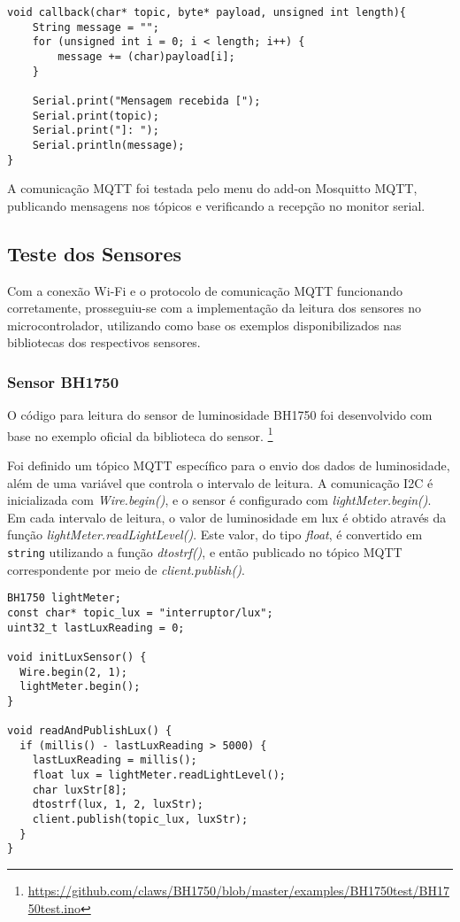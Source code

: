 \documentclass[]{abntex2}
\begin{document}
\begin{verbatim}
void callback(char* topic, byte* payload, unsigned int length){
	String message = "";
	for (unsigned int i = 0; i < length; i++) {
		message += (char)payload[i];
	}

	Serial.print("Mensagem recebida [");
	Serial.print(topic);
	Serial.print("]: ");
	Serial.println(message);
}
\end{verbatim}

A comunicação MQTT foi testada pelo menu do add-on Mosquitto MQTT, publicando
mensagens nos tópicos e verificando a recepção no monitor serial.

\subsection{Teste dos Sensores}
Com a conexão Wi-Fi e o protocolo de comunicação MQTT funcionando corretamente,
prosseguiu-se com a implementação da leitura dos sensores no microcontrolador,
utilizando como base os exemplos disponibilizados nas bibliotecas dos
respectivos sensores.

\subsubsection{Sensor BH1750}

O código para leitura do sensor de luminosidade BH1750 foi desenvolvido com base no exemplo
oficial da biblioteca do sensor.
\footnote{\url{https://github.com/claws/BH1750/blob/master/examples/BH1750test/BH1750test.ino}}


Foi definido um tópico MQTT específico para o envio dos dados de luminosidade,
além de uma variável que controla o intervalo de leitura. A comunicação I2C é
inicializada com
\textit{Wire.begin()}, e o sensor é configurado com
\textit{lightMeter.begin()}.
Em cada intervalo de leitura, o valor de luminosidade em lux é obtido através
da função \textit{lightMeter.readLightLevel()}. Este valor, do tipo
\textit{float}, é convertido em \texttt{string} utilizando a função
\textit{dtostrf()}, e então publicado no tópico MQTT correspondente por meio de
\textit{client.publish()}.
\clearpage
\begin{verbatim}
BH1750 lightMeter;
const char* topic_lux = "interruptor/lux";
uint32_t lastLuxReading = 0;

void initLuxSensor() {
  Wire.begin(2, 1);
  lightMeter.begin();
}

void readAndPublishLux() {
  if (millis() - lastLuxReading > 5000) {
    lastLuxReading = millis();
    float lux = lightMeter.readLightLevel();
    char luxStr[8];
    dtostrf(lux, 1, 2, luxStr);
    client.publish(topic_lux, luxStr);
  }
}
\end{verbatim}
\end{document}
